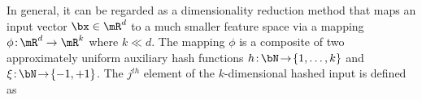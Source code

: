 \documentclass{article} %
\begin{document}
%
In general, it can be regarded as a dimensionality reduction method that maps an input vector $\bx\in\mR^d$ to a much smaller feature space via a mapping   $\phi\colon\!\mR^d\rightarrow \mR^k$ where $k\ll d$. The mapping $\phi$ is a composite of two approximately uniform auxiliary hash functions $h\colon\!\bN\!\rightarrow\!\{1,\dots,k\}$ and $\xi\colon\!\bN \!\rightarrow\!\{-1,+1\}$. The $j^{th}$ element of the $k$-dimensional hashed input is defined as
\end{document}
